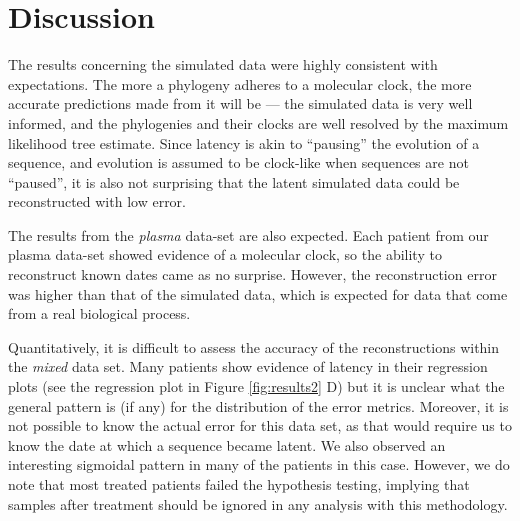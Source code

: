 \documentclass[12pt]{article}
\begin{document}
\section * {Discussion} \label{sec:discuss}

The results concerning the simulated data were highly consistent with expectations. 
The more a phylogeny adheres to a molecular clock, the more accurate predictions made from it will be --- the simulated data is very well informed, and the phylogenies and their clocks are well resolved by the maximum likelihood tree estimate. 
Since latency is akin to ``pausing'' the evolution of a sequence, and evolution is assumed to be clock-like when sequences are not ``paused'', it is also not surprising that the latent simulated data could be reconstructed with low error. 

The results from the {\em plasma} data-set are also expected. 
Each patient from our plasma data-set showed evidence of a molecular clock, so the ability to reconstruct known dates came as no surprise. 
However, the reconstruction error was higher than that of the simulated data, which is expected for data that come from a real biological process.

Quantitatively, it is difficult to assess the accuracy of the reconstructions within the {\em mixed} data set. 
Many patients show evidence of latency in their regression plots (see the regression plot in Figure \ref{fig:results2} D) but it is unclear what the general pattern is (if any) for the distribution of the error metrics. 
Moreover, it is not possible to know the actual error for this data set, as that would require us to know the date at which a sequence became latent. 
We also observed an interesting sigmoidal pattern in many of the patients in this case.
However, we do note that most treated patients failed the hypothesis testing, implying that samples after treatment should be ignored in any analysis with this methodology.

\end{document}
